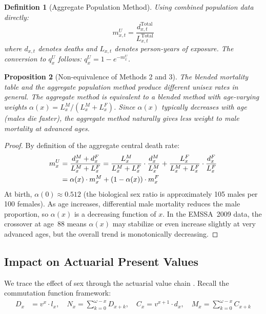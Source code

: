 \documentclass[12pt,a4paper]{article}
\newtheorem{definition}{Definition}[section]
\newtheorem{proposition}[definition]{Proposition}
\newcommand{\qx}[1]{q_{#1}}
\newcommand{\mx}[1]{m_{#1}}
\newcommand{\lx}[1]{l_{#1}}
\newcommand{\dx}[1]{d_{#1}}
\newcommand{\Dx}[1]{D_{#1}}
\newcommand{\Nx}[1]{N_{#1}}
\newcommand{\Mx}[1]{M_{#1}}
\newcommand{\Cx}[1]{C_{#1}}
\begin{document}
\begin{definition}[Aggregate Population Method]
\label{def:aggregate-method}
Using combined population data directly:
\begin{equation}
\label{eq:aggregate-mx}
  \mx{x,t}^U = \frac{d_{x,t}^{\text{Total}}}{L_{x,t}^{\text{Total}}}
\end{equation}
where $d_{x,t}$ denotes deaths and $L_{x,t}$ denotes person-years of exposure.
The conversion to $\qx{x}^U$ follows: $\qx{x}^U = 1 - e^{-\mx{x}^U}$.
\end{definition}

\begin{proposition}[Non-equivalence of Methods 2 and 3]
\label{prop:non-equivalence}
The blended mortality table and the aggregate population method produce different
unisex rates in general. The aggregate method is equivalent to a blended method
with \emph{age-varying} weights $\alpha(x) = L_x^M / (L_x^M + L_x^F)$.
Since $\alpha(x)$ typically decreases with age (males die faster), the aggregate
method naturally gives less weight to male mortality at advanced ages.
\end{proposition}

\begin{proof}
By definition of the aggregate central death rate:
\begin{align}
  \mx{x}^U &= \frac{d_x^M + d_x^F}{L_x^M + L_x^F}
  = \frac{L_x^M}{L_x^M + L_x^F} \cdot \frac{d_x^M}{L_x^M}
   + \frac{L_x^F}{L_x^M + L_x^F} \cdot \frac{d_x^F}{L_x^F} \notag \\
  &= \alpha(x) \cdot \mx{x}^M + (1 - \alpha(x)) \cdot \mx{x}^F
\end{align}
At birth, $\alpha(0) \approx 0.512$ (the biological sex ratio is approximately
105 males per 100 females). As age increases, differential male mortality reduces
the male proportion, so $\alpha(x)$ is a decreasing function of $x$. In the
EMSSA~2009 data, the crossover at age~88 means $\alpha(x)$ may stabilize or
even increase slightly at very advanced ages, but the overall trend is
monotonically decreasing.
\end{proof}

\subsection{Impact on Actuarial Present Values}
\label{subsec:impact-apv}

We trace the effect of sex through the actuarial value chain \cite{bowers1997}. Recall the
commutation function framework:
\begin{align}
\label{eq:commutation}
  \Dx{x} &= v^x \cdot \lx{x}, \quad
  \Nx{x} = \sum_{k=0}^{\omega - x} \Dx{x+k}, \quad
  \Cx{x} = v^{x+1} \cdot \dx{x}, \quad
  \Mx{x} = \sum_{k=0}^{\omega - x} \Cx{x+k}
\end{align}
\end{document}
